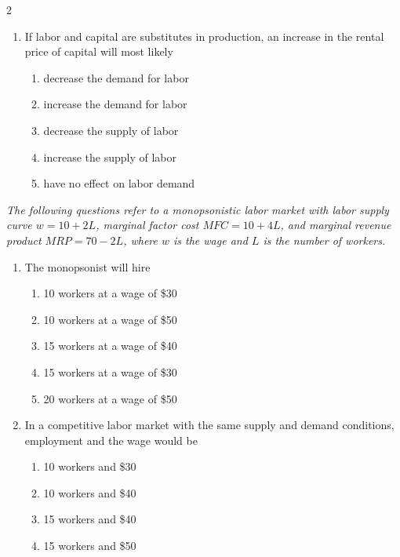 \documentclass[10pt]{article}
\newenvironment{choiceslist}
  {\begin{enumerate}[label=(\Alph*), leftmargin=1.6em, itemsep=0.12em, topsep=0.18em, parsep=0pt]}
  {\end{enumerate}}
\newenvironment{stimulus}
  {\begin{center}\begin{minipage}{0.96\columnwidth}\footnotesize\itshape\setlength{\tabcolsep}{3pt}\renewcommand{\arraystretch}{0.96}}
  {\end{minipage}\end{center}}
\begin{document}
\begin{multicols*}{2}
\begin{enumerate}[resume*=apq, leftmargin=*, itemsep=0.85em, topsep=0.2em, parsep=0pt]
\begin{choiceslist}
\item relatively elastic
\item relatively inelastic
\item perfectly elastic
\item unit elastic
\item perfectly inelastic
\end{choiceslist}
\item If labor and capital are substitutes in production, an increase in the rental price of capital will most likely
\begin{choiceslist}
\item decrease the demand for labor
\item increase the demand for labor
\item decrease the supply of labor
\item increase the supply of labor
\item have no effect on labor demand
\end{choiceslist}
\end{enumerate}
\begin{stimulus}
The following questions refer to a monopsonistic labor market with labor supply curve $w = 10 + 2L$, marginal factor cost $MFC = 10 + 4L$, and marginal revenue product $MRP = 70 - 2L$, where $w$ is the wage and $L$ is the number of workers.
\end{stimulus}
\begin{enumerate}[resume*=apq, leftmargin=*, itemsep=0.85em, topsep=0.2em, parsep=0pt]
\item The monopsonist will hire
\begin{choiceslist}
\item 10 workers at a wage of \$30
\item 10 workers at a wage of \$50
\item 15 workers at a wage of \$40
\item 15 workers at a wage of \$30
\item 20 workers at a wage of \$50
\end{choiceslist}
\item In a competitive labor market with the same supply and demand conditions, employment and the wage would be
\begin{choiceslist}
\item 10 workers and \$30
\item 10 workers and \$40
\item 15 workers and \$40
\item 15 workers and \$50

\end{choiceslist}
\end{enumerate}
\end{multicols*}
\end{document}
